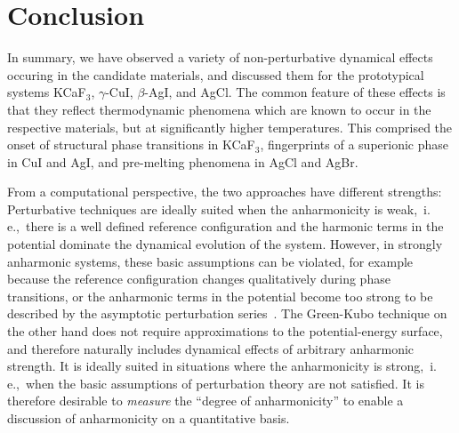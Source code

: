 


\section{Conclusion}


In summary, we have observed a variety of non-perturbative dynamical effects occuring in the candidate materials, and discussed them for the prototypical systems KCaF$_3$, $\gamma$-CuI, $\beta$-AgI, and AgCl. The common feature of these effects is that they reflect thermodynamic phenomena which are known to occur in the respective materials, but at significantly higher temperatures. This comprised the onset of structural phase transitions in KCaF$_3$, fingerprints of a superionic phase in CuI and AgI, and pre-melting phenomena in AgCl and AgBr.

From a computational perspective, the two approaches have different strengths: Perturbative techniques are ideally suited when the anharmonicity is weak,~i.\,e.,~there is a well defined reference configuration and the harmonic terms in the potential dominate the dynamical evolution of the system. However, in strongly anharmonic systems, these basic assumptions can be violated, for example because the reference configuration changes qualitatively during phase transitions, or the anharmonic terms in the potential become too strong to be described by the asymptotic perturbation series~\cite[p.\,53]{NegeleOrland}. The Green-Kubo technique on the other hand does not require approximations to the potential-energy surface, and therefore naturally includes dynamical effects of arbitrary anharmonic strength. It is ideally suited in situations where the anharmonicity is strong,~i.\,e.,~when the basic assumptions of perturbation theory are not satisfied. It is therefore desirable to \emph{measure} the ``degree of anharmonicity'' to enable a discussion of anharmonicity on a quantitative basis.

